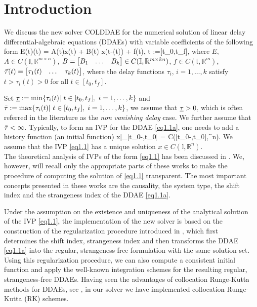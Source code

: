 \documentclass[final,reqno]{siamltex}
\begin{document}
\section{Introduction}
We discuss the new solver COLDDAE for the numerical solution of linear delay differential-algebraic equations (DDAEs) with variable coefficients of the following form
%
\bsq\label{eq1.1}
\be\label{eq1.1a}
 E(t)(t) = A(t)x(t) + B(t) x(t-\vtau(t)) + f(t), \quad t\in {} :=[t_0,t_f],
\ee
%
where $E$, $A \in C(\mathbb{I},\mathbb{R}^{m\times n})$, $B = \begin{bmatrix} B_1 & \dots & B_k \end{bmatrix} \in C(\mathbb{I},\mathbb{R}^{m\times kn})$, 
$f\in C(\mathbb{I},\mathbb{R}^{m})$, $\vec{\tau}(t) = \begin{bmatrix} \tau_1(t) & \dots & \tau_k(t) \end{bmatrix}$, 
where the delay functions $\tau_i$, $i=1,\dots,k$ satisfy $t > \tau_i(t) > 0$ for all $t\in [t_0,t_f]$.	

Set $\underline{\tau} := \min \{\tau_i(t)| \ t\in [t_0,t_f], \ i=1,\dots,k \}$ and $\bar{\tau} := \max \{\tau_i(t)| \ t\in [t_0,t_f], \ i=1,\dots,k \}$, 
we assume that $\underline{\tau} >0$, which is often referred in the literature \cite{BelC63,BakPT02} as the \emph{non vanishing delay} case. 
We further assume that $\bar{\tau} < \infty$. Typically, to form an IVP for the DDAE \eqref{eq1.1a}, one needs to add a history function (an initial function) 
%
\be
 x|_{[t_0-\otau,t_0]} = \phi \in C([t_0-\otau,t_0],\R^n).
\ee
%
We assume that the IVP \eqref{eq1.1} has a unique solution $x\in C(\mathbb{I},\mathbb{R}^n)$.\\
\esq
%
The theoretical analysis of IVPs of the form \eqref{eq1.1} has been discussed in \cite{HaMS14,HaM14}. 
We, however, will recall only the appropriate parts of these works to make the procedure of computing the solution of \eqref{eq1.1} transparent.
The most important concepts presented in these works are the causality, the system type, the shift index and the strangeness index of the DDAE \eqref{eq1.1a}.

Under the assumption on the existence and uniqueness of the analytical solution of the IVP \eqref{eq1.1}, the implementation of the new solver is based on the construction 
of the regularization procedure introduced in \cite{HaM14}, which first determines the shift index, strangeness index and then transforms the DDAE \eqref{eq1.1a} into 
the regular, strangeness-free formulation with the same solution set. Using this regularization procedure, we can also compute a consistent initial function and apply the 
well-known integration schemes for the resulting regular, strangeness-free DDAEs. 
Having seen the advantages of collocation Runge-Kutta methods for DDAEs, see \cite{GugH01,GugH07}, in our solver we have implemented collocation Runge-Kutta (RK) schemes. 
%
\end{document}
